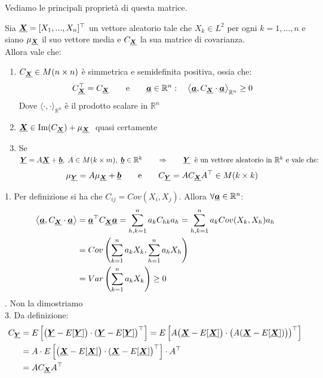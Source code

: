 \noindent Vediamo le principali proprietà di questa matrice.

\begin{teorema}
\label{th:11.17}
    Sia $\underline{{\boldsymbol{X}}} = [X_1, ..., X_n]^\top$ un vettore aleatorio tale che $X_k\in L^2$ per ogni $k=1, ..., n$ e siano $\mu_{\underline{{\boldsymbol{X}}}}$ il suo vettore media e $C_{\underline{{\boldsymbol{X}}}}$ la sua matrice di covarianza.\\
    Allora vale che:
    \begin{enumerate}
        \item $C_{\underline{{\boldsymbol{X}}}}\in M(n\times n)$ è simmetrica e semidefinita positiva, ossia che:
        \[C_{\underline{{\boldsymbol{X}}}}^\top = C_{\underline{{\boldsymbol{X}}}}\qquad \text{e}\qquad \underline{{\boldsymbol{a}}}\in\mathbb{R}^n:\quad \left\langle \underline{{\boldsymbol{a}}},  C_{\underline{{\boldsymbol{X}}}}\cdot \underline{{\boldsymbol{a}}}\right\rangle_{\mathbb{R}^n} \geq 0\]
        Dove $\langle \cdot, \cdot \rangle_{\mathbb{R}^n}$ è il prodotto scalare in $\mathbb{R}^n$
        \item $\underline{{\boldsymbol{X}}} \in \text{Im}(C_{\underline{{\boldsymbol{X}}}})+\mu_{\underline{{\boldsymbol{X}}}}\;$ quasi certamente
        \item Se $\underline{{\boldsymbol{Y}}}= A\underline{{\boldsymbol{X}}}+\underline{{\boldsymbol{b}}}, \;A\in M(k\times m), \;\underline{{\boldsymbol{b}}}\in \mathbb{R}^k \qquad \Rightarrow\qquad \underline{{\boldsymbol{Y}}}\;\text{ è un vettore aleatorio in $\mathbb{R}^k$ e vale che:}$
        \[\mu_{\underline{{\boldsymbol{Y}}}} = A \mu_{\underline{{\boldsymbol{X}}}} + \underline{{\boldsymbol{b}}}\qquad \text{e}\qquad C_{\underline{{\boldsymbol{Y}}}} = A C_{\underline{{\boldsymbol{X}}}}A^\top \in M(k\times k)\]
    \end{enumerate}
    \begin{dimostrazione}
        1. Per definizione si ha che $C_{ij} = Cov(X_i, X_j)$. Allora $\forall\underline{{\boldsymbol{a}}}\in\mathbb{R}^n$:
        \begin{align*}
            \left\langle \underline{{\boldsymbol{a}}},  C_{\underline{{\boldsymbol{X}}}}\cdot \underline{{\boldsymbol{a}}}\right\rangle & = \underline{{\boldsymbol{a}}}^\top C_{\underline{{\boldsymbol{X}}}} \underline{{\boldsymbol{a}}} = \sum_{h, k=1}^n a_k C_{hk} a_h = \sum_{h, k=1}^na_k Cov(X_k, X_h)a_h \\
            & = Cov\left(\sum_{k=1}^na_kX_k, \sum_{h=1}^n a_h X_h\right)\\
            & = Var\left(\sum_{k=1}^n a_k X_k\right)\geq 0
        \end{align*}
        \bigskip 
        . Non la dimostriamo\\
        3. Da definizione:
        \begin{align*}
            C_{\underline{{\boldsymbol{Y}}}} & = E\left[\bigl(\underline{{\boldsymbol{Y}}}-E[\underline{{\boldsymbol{Y}}}]\bigr)\cdot (\underline{{\boldsymbol{Y}}}-E[\underline{{\boldsymbol{Y}}}]\bigr)^\top\right] =  E\left[A\bigl(\underline{{\boldsymbol{X}}}-E[\underline{{\boldsymbol{X}}}]\bigr)\cdot \bigl(A(\underline{{\boldsymbol{X}}}-E[\underline{{\boldsymbol{X}}}])\bigr)\bigr)^\top\right]\\
            & = A \cdot E\left[\bigl(\underline{{\boldsymbol{X}}}-E[\underline{{\boldsymbol{X}}}]\bigr)\cdot (\underline{{\boldsymbol{X}}}-E[\underline{{\boldsymbol{X}}}]\bigr)^\top\right]\cdot A^\top \\
            & = A C_{\underline{{\boldsymbol{X}}}}A^\top
        \end{align*}
    \end{dimostrazione}
\end{teorema}


